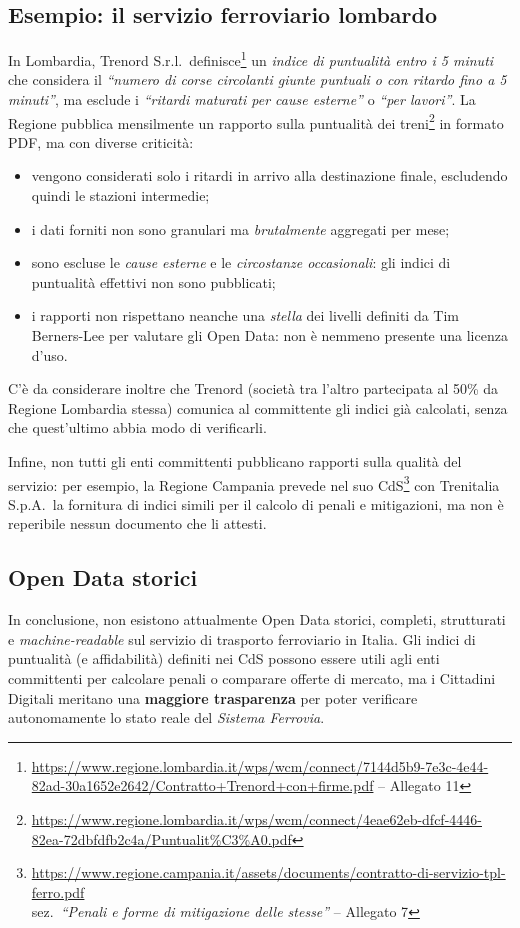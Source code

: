 \documentclass[italian,11pt,a4paper,final]{article}
\begin{document}
	\subsection{Esempio: il servizio ferroviario lombardo}
	In Lombardia, Trenord S.r.l.\ definisce\footnote{\url{https://www.regione.lombardia.it/wps/wcm/connect/7144d5b9-7e3c-4e44-82ad-30a1652e2642/Contratto+Trenord+con+firme.pdf} -- Allegato 11} un \textit{indice di puntualità entro i 5 minuti} che considera il \textit{``numero di corse circolanti giunte puntuali o con ritardo fino a 5 minuti''}, ma esclude i \textit{``ritardi maturati per cause esterne''} o \textit{``per lavori''}.
	La Regione pubblica mensilmente un rapporto sulla puntualità dei treni\footnote{\url{https://www.regione.lombardia.it/wps/wcm/connect/4eae62eb-dfcf-4446-82ea-72dbfdfb2c4a/Puntualit\%C3\%A0.pdf}} in formato PDF, ma con diverse criticità:
	\begin{itemize}
		\item vengono considerati solo i ritardi in arrivo alla destinazione finale, escludendo quindi le stazioni intermedie;
		\item i dati forniti non sono granulari ma \textit{brutalmente} aggregati per mese;
		\item sono escluse le \textit{cause esterne} e le \textit{circostanze occasionali}: gli indici di puntualità effettivi non sono pubblicati;
		\item i rapporti non rispettano neanche una \textit{stella} dei livelli definiti da Tim Berners-Lee per valutare gli Open Data: non è nemmeno presente una licenza d'uso.
	\end{itemize}

	C'è da considerare inoltre che Trenord (società tra l'altro partecipata al 50\% da Regione Lombardia stessa) comunica al committente gli indici già calcolati, senza che quest'ultimo abbia modo di verificarli.

	Infine, non tutti gli enti committenti pubblicano rapporti sulla qualità del servizio: per esempio, la Regione Campania prevede nel suo CdS\footnote{
		\url{https://www.regione.campania.it/assets/documents/contratto-di-servizio-tpl-ferro.pdf} \\
		sez.\ \textit{``Penali e forme di mitigazione delle stesse''} -- Allegato 7
	} con Trenitalia S.p.A.\ la fornitura di indici simili per il calcolo di penali e mitigazioni,
	ma non è reperibile nessun documento che li attesti. \\

	\subsection{Open Data storici}
	In conclusione, non esistono attualmente Open Data {storici}, completi, strutturati e \textit{machine-readable} sul servizio di trasporto ferroviario in Italia.
	Gli indici di puntualità (e affidabilità) definiti nei CdS possono essere utili agli enti committenti per calcolare penali o comparare offerte di mercato, ma i Cittadini Digitali meritano una \textbf{maggiore trasparenza} per poter verificare autonomamente lo stato reale del \textit{Sistema Ferrovia}.
\end{document}
